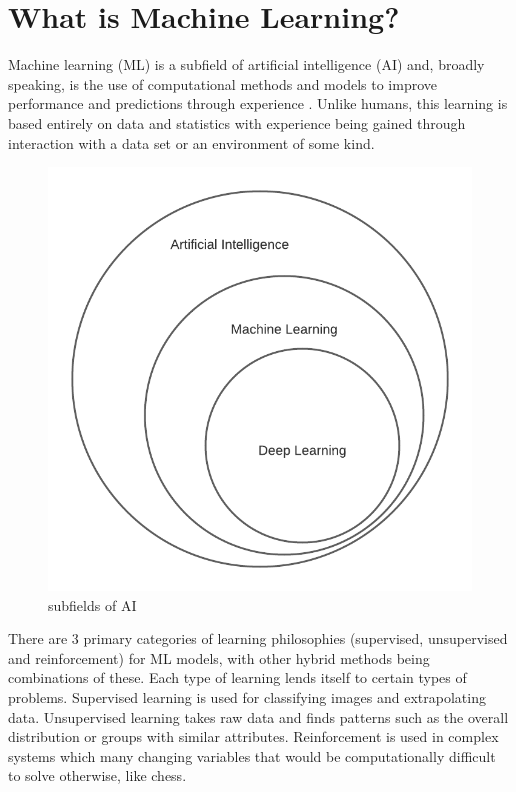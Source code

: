 \documentclass[10pt,a4paper]{report}
\begin{document}
		\section{What is Machine Learning?}
			Machine learning (ML) is a subfield of artificial intelligence (AI) and,
			broadly speaking, is the use of computational methods and models to improve
			performance and predictions through experience \autocite[p. 1]{FoundationsOfMachineLearning}.
			Unlike humans, this learning is based entirely on data and statistics with
			experience being gained through interaction with a data set
			or an environment of some kind. \par
			\begin{figure}[h]
				\centering
				\includegraphics[scale=0.8]{ai-fields-euler-diagram.png}
				\caption{subfields of AI}
				\label{fig:ai-subfields}
			\end{figure}
			There are 3 primary categories of learning philosophies (supervised, unsupervised and reinforcement) for ML models,
			with other hybrid methods being combinations of these. Each type of learning lends itself to certain types of problems.
			Supervised learning is used for classifying images and extrapolating data. Unsupervised learning
			takes raw data and finds patterns such as the overall distribution or groups with similar attributes. Reinforcement is used in complex
			systems which many changing variables that would be computationally difficult to solve otherwise, like chess.
\end{document}
